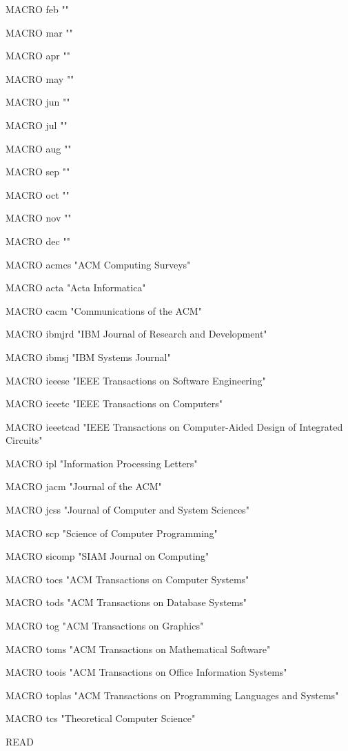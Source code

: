 MACRO {feb} {"\bblfeb{}"}

MACRO {mar} {"\bblmar{}"}

MACRO {apr} {"\bblapr{}"}

MACRO {may} {"\bblmay{}"}

MACRO {jun} {"\bbljun{}"}

MACRO {jul} {"\bbljul{}"}

MACRO {aug} {"\bblaug{}"}

MACRO {sep} {"\bblsep{}"}

MACRO {oct} {"\bbloct{}"}

MACRO {nov} {"\bblnov{}"}

MACRO {dec} {"\bbldec{}"}

MACRO {acmcs} {"ACM Computing Surveys"}

MACRO {acta} {"Acta Informatica"}

MACRO {cacm} {"Communications of the ACM"}

MACRO {ibmjrd} {"IBM Journal of Research and Development"}

MACRO {ibmsj} {"IBM Systems Journal"}

MACRO {ieeese} {"IEEE Transactions on Software Engineering"}

MACRO {ieeetc} {"IEEE Transactions on Computers"}

MACRO {ieeetcad}
 {"IEEE Transactions on Computer-Aided Design of Integrated Circuits"}

MACRO {ipl} {"Information Processing Letters"}

MACRO {jacm} {"Journal of the ACM"}

MACRO {jcss} {"Journal of Computer and System Sciences"}

MACRO {scp} {"Science of Computer Programming"}

MACRO {sicomp} {"SIAM Journal on Computing"}

MACRO {tocs} {"ACM Transactions on Computer Systems"}

MACRO {tods} {"ACM Transactions on Database Systems"}

MACRO {tog} {"ACM Transactions on Graphics"}

MACRO {toms} {"ACM Transactions on Mathematical Software"}

MACRO {toois} {"ACM Transactions on Office Information Systems"}

MACRO {toplas} {"ACM Transactions on Programming Languages and Systems"}

MACRO {tcs} {"Theoretical Computer Science"}

READ


